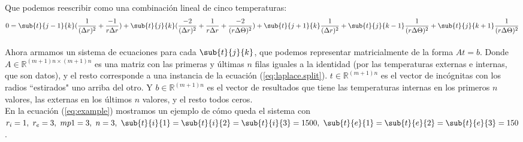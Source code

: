 \documentclass[12pt]{article}
\begin{document}
Que podemos reescribir como una combinación lineal de cinco temperaturas:
\begin{equation}
\label{eq:laplace.split}
0 = \sub{t}{j-1}{k} (\frac{1}{(\Delta r)^{2}} + \frac{-1}{r \Delta r}) + \sub{t}{j}{k} (\frac{-2}{(\Delta r)^2} + \frac{1}{r \Delta r} + \frac{-2}{(r \Delta \Theta)^{2}}) + \sub{t}{j+1}{k} \frac{1}{(\Delta r)^{2}} + \sub{t}{j}{k-1} \frac{1}{(r \Delta \Theta)^{2}} + \sub{t}{j}{k+1} \frac{1}{(r\Delta \Theta)^{2}}
\end{equation}
\paragraph{} Ahora armamos un sistema de ecuaciones para cada \(\sub{t}{j}{k}\), que podemos representar matricialmente de la forma \(At = b\). Donde \(A \in \mathbb{R}^{(m+1)n \times (m+1)n}\) es una matriz con las primeras y últimas \(n\) filas iguales a la identidad (por las temperaturas externas e internas, que son datos), y el resto corresponde a una instancia de la ecuación (\ref{eq:laplace.split}). \(t \in \mathbb{R}^{(m+1)n}\) es el vector de incógnitas con los radios ``estirados" uno arriba del otro. Y  \(b \in \mathbb{R}^{(m+1)n}\) es el vector de resultados que tiene las temperaturas internas en los primeros \(n\) valores, las externas en los últimos \(n\) valores, y el resto todos ceros. \\
En la ecuación (\ref{eq:example}) mostramos un ejemplo de cómo queda el sistema con \(r_i = 1,\ r_e = 3,\ mp1 = 3,\ n = 3,\ \sub{t}{i}{1} = \sub{t}{i}{2} = \sub{t}{i}{3} = 1500,\ \sub{t}{e}{1} = \sub{t}{e}{2} = \sub{t}{e}{3} = 150\).
\end{document}
